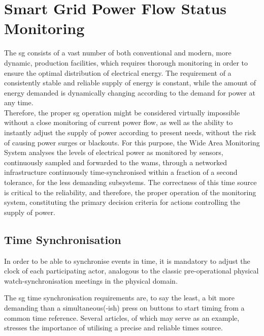 \chapter{Smart Grid Power Flow Status Monitoring}

The \acrshort{sg} consists of a vast number of both conventional and modern, more dynamic, production facilities, which requires thorough monitoring in order to ensure the optimal distribution of electrical energy. The requirement of a consistently stable and reliable supply of energy is constant, while the amount of energy demanded is dynamically changing according to the demand for power at any time. \\ 

Therefore, the proper \acrlong{sg} operation might be considered virtually impossible without a  close monitoring of current power flow, as well as the ability to instantly adjust the supply of power according to present needs,  without the risk of causing power surges or blackouts. For this purpose, the Wide Area Monitoring System analyses the levels of electrical power as monitored by sensors, continuously sampled and forwarded to the \acrshort{wams}, through  a networked infrastructure continuously time-synchronised within a fraction of a second tolerance, for the less demanding subsystems.
The correctness of this time source is critical to the reliability, and therefore, the proper operation of the monitoring system, constituting the primary decision criteria for actions controlling the supply of power.




\section{Time Synchronisation}

In order to be able to synchronise events in time, it is mandatory to adjust the clock of each participating actor, analogous to the classic pre-operational physical watch-synchronisation meetings in the physical domain. 

The \acrshort{sg} time synchronisation requirements are, to say the least, a bit more demanding than a simultaneous(-ish) press on buttons to start timing from a common time reference.
Several articles, of which \cite{appasani2018review} may serve as an example, stresses the importance of utilising a precise and reliable times source.

%





